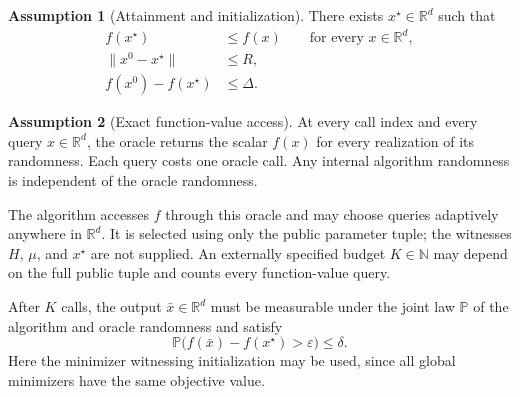 \documentclass[10pt]{article}
\theoremstyle{definition}
\newtheorem{assumption}{Assumption}
\begin{document}
\begin{assumption}[Attainment and initialization]
There exists $x^\star\in\mathbb{R}^d$ such that
\[
\begin{aligned}
f(x^\star)&\leq f(x)\qquad\text{for every }x\in\mathbb{R}^d,\\
\|x^0-x^\star\|&\leq R,\\
f(x^0)-f(x^\star)&\leq\Delta.
\end{aligned}
\]
\end{assumption}

\begin{assumption}[Exact function-value access]
At every call index and every query $x\in\mathbb{R}^d$, the oracle returns the scalar $f(x)$ for every realization of its randomness. Each query costs one oracle call. Any internal algorithm randomness is independent of the oracle randomness.
\end{assumption}

The algorithm accesses $f$ through this oracle and may choose queries adaptively anywhere in $\mathbb{R}^d$. It is selected using only the public parameter tuple; the witnesses $H$, $\mu$, and $x^\star$ are not supplied. An externally specified budget $K\in\mathbb{N}$ may depend on the full public tuple and counts every function-value query.

After $K$ calls, the output $\bar{x}\in\mathbb{R}^d$ must be measurable under the joint law $\mathbb{P}$ of the algorithm and oracle randomness and satisfy
\[
\mathbb{P}\bigl(f(\bar{x})-f(x^\star)>\varepsilon\bigr)\leq\delta.
\]
Here the minimizer witnessing initialization may be used, since all global minimizers have the same objective value.
\end{document}
